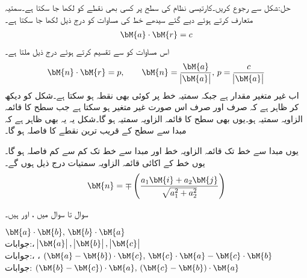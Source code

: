 حل:شکل  سے رجوع کریں۔کارتیسی نظام کی  سطح پر کسی بھی نقطے کو  لکھا جا سکتا ہے۔سمتیہ  متعارف کرتے ہوئے دیے گئے سیدھے خط کی مساوات کو درج ذیل لکھا جا سکتا ہے۔
\begin{align*}
\bM{a}\cdot \bM{r}=c
\end{align*} 
اس مساوات کو  سے تقسیم کرتے ہوئے درج ذیل ملتا ہے۔
\begin{align*}
\bM{n}\cdot \bM{r}=p,\quad \quad \bM{n}=\frac{\bM{a}}{\abs{\bM{a}}},\, p=\frac{c}{\abs{\bM{a}}}
\end{align*}
اب  غیر متغیر مقدار ہے جبکہ سمتیہ  خط پر کوئی بھی نقطہ ہو سکتا ہے۔شکل کو دیکھ کر ظاہر ہے کہ  صرف اور صرف اس صورت غیر متغیر ہو سکتا ہے جب  سطح کا قائمہ الزاویہ سمتیہ ہو۔یوں  بھی سطح کا قائمہ الزاویہ سمتیہ ہو گا۔شکل یہ یہ بھی ظاہر ہے کہ مبدا سے سطح کے قریب ترین نقطے کا فاصلہ  ہو گا۔

یوں مبدا سے خط تک قائمہ الزاویہ خط  اور مبدا سے خط تک کم سے کم فاصلہ  ہو گا۔یوں خط کے اکائی قائمہ الزاویہ سمتیات درج ذیل ہوں گے۔
\begin{align*}
\bM{n}=\mp \left(\frac{a_1\bM{i}+a_2\bM{j}}{\sqrt{a_1^2+a_2^2}}\right)
\end{align*} 

سوال  تا سوال  میں ،  اور  ہیں۔

\quad
$\bM{a}\cdot \bM{b},\, \bM{b}\cdot\bM{a}$\\

جوابات:، 
\quad
$\abs{\bM{a}},\, \abs{\bM{b}},\, \abs{\bM{c}}$\\

جوابات:، ، 
\quad
$(\bM{a}-\bM{b})\cdot \bM{c},\, \bM{c}\cdot\bM{a}-\bM{c}\cdot \bM{b}$\\

جوابات:
\quad
$(\bM{b}-\bM{c})\cdot \bM{a},\, (\bM{c}-\bM{b})\cdot \bM{a}$\\


